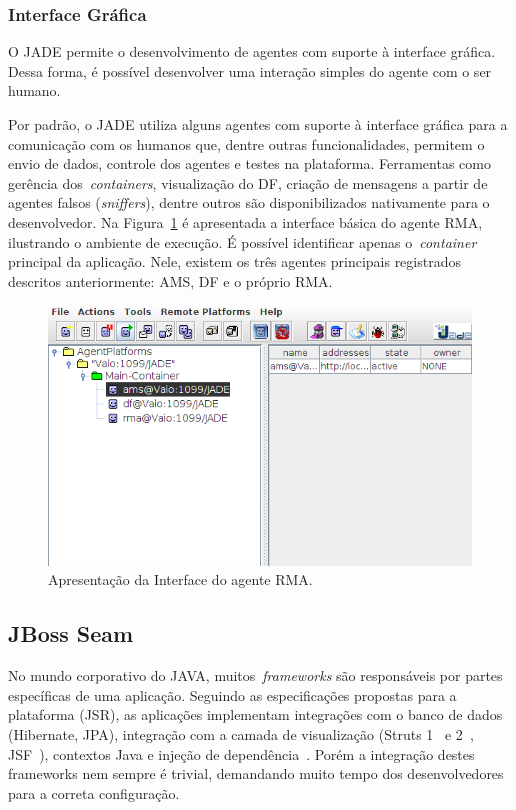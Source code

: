 \subsubsection{Interface Gráfica}
O JADE permite o desenvolvimento de agentes com suporte à interface gráfica. Dessa forma, é possível desenvolver uma interação simples do agente com o ser humano.

Por padrão, o JADE utiliza alguns agentes com suporte à interface gráfica para a comunicação com os humanos que, dentre outras funcionalidades, permitem o envio de dados, controle dos agentes e testes na plataforma. Ferramentas como gerência dos~\emph{containers}, visualização do DF, criação de mensagens a partir de agentes falsos (\emph{sniffers}), dentre outros são disponibilizados nativamente para o desenvolvedor. Na Figura~\ref{fig:tela-jade} é apresentada a interface básica do agente RMA, ilustrando o ambiente de execução. É possível identificar apenas o~\emph{container} principal da aplicação. Nele, existem os três agentes principais registrados descritos anteriormente: AMS, DF e o próprio RMA.

\begin{figure}
	\centering
	\includegraphics[scale=0.65]{images/tela-jade.png}
	\caption{Apresentação da Interface do agente RMA.}
	\label{fig:tela-jade}
\end{figure}

\subsection{JBoss Seam}

No mundo corporativo do JAVA, muitos~\emph{frameworks} são responsáveis por partes específicas de uma aplicação. Seguindo as especificações propostas para a plataforma (JSR), as aplicações implementam integrações com o banco de dados (Hibernate, JPA), integração com a camada de visualização (Struts 1~\cite{struts1} e 2~\cite{struts2}, JSF~\cite{jsf2012}), contextos Java e injeção de dependência~\cite{di2012}. Porém a integração destes frameworks nem sempre é trivial, demandando muito tempo dos desenvolvedores para a correta configuração.

